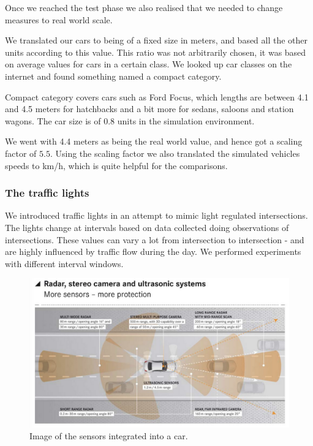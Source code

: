 Once we reached the test phase we also realised that we needed to change measures to real world scale.

We translated our cars to being of a fixed size in meters, and based all the other units according to this value.
This ratio was not arbitrarily chosen, it was based on average values for cars in a certain class.
We looked up car classes on the internet and found something named a compact category.

Compact category covers cars such as Ford Focus, which lengths are between 4.1 and 4.5 meters for hatchbacks and a bit more for sedans, saloons and station wagons.
The car size is of 0.8 units in the simulation environment.

We went with 4.4 meters as being the real world value, and hence got a scaling factor of $5.5$.
Using the scaling factor we also translated the simulated vehicles speeds to km/h, which is quite helpful for the comparisons.

\subsubsection*{The traffic lights}
We introduced traffic lights in an attempt to mimic light regulated intersections.
The lights change at intervals based on data collected doing observations of intersections. 
These values can vary a lot from intersection to intersection - and are highly influenced by traffic flow during the day. 
We performed experiments with different interval windows.

\begin{figure}
\centering
\includegraphics[scale=.2]{img/tesla_sensor}
\caption{Image of the sensors integrated into a car.}
\label{figure:tesla_sens}
\end{figure}

